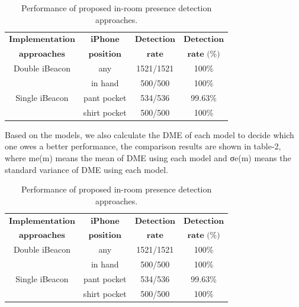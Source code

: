 \documentclass[12pt]{report}
\begin{document}
\begin{table}[!htp]
\begin{center}
\caption{Performance of proposed in-room presence detection approaches.} 
\begin{tabular}[b]{ c || c c c}
	\hline
	\hline
	$\textbf{Implementation}$	& $\textbf{iPhone}$   & $\textbf{Detection}$ & $\textbf{Detection}$\\
	$\textbf{approaches}$ & $\textbf{position}$ & $\textbf{rate}$      & $\textbf{rate (\%)}$\\
  \hline
	Double iBeacon 	& any						& 1521/1521 & 100\% \\
	\hline								
									& in hand 			& 500/500		& 100\% \\
	Single iBeacon	& pant pocket 	& 534/536		& 99.63\% \\
									& shirt pocket	& 500/500		& 100\% \\
	\hline
	\hline
\end{tabular}
\end{center}
\vspace{-6mm}
\end{table}

Based on the models, we also calculate the DME of each model to decide which one owes a better performance, the comparison results are shown in table-2, where me(m) means the mean of DME using each model and σe(m) means the standard variance of DME using each model.

\begin{table}[!htp]
\begin{center}
\caption{Performance of proposed in-room presence detection approaches.} 
\begin{tabular}[b]{ c || c c c}
	\hline
	\hline
	$\textbf{Implementation}$	& $\textbf{iPhone}$   & $\textbf{Detection}$ & $\textbf{Detection}$\\
	$\textbf{approaches}$ & $\textbf{position}$ & $\textbf{rate}$      & $\textbf{rate (\%)}$\\
  \hline
	Double iBeacon 	& any						& 1521/1521 & 100\% \\
	\hline								
									& in hand 			& 500/500		& 100\% \\
	Single iBeacon	& pant pocket 	& 534/536		& 99.63\% \\
									& shirt pocket	& 500/500		& 100\% \\
	\hline
	\hline
\end{tabular}
\end{center}
\vspace{-6mm}
\end{table}
\end{document}
